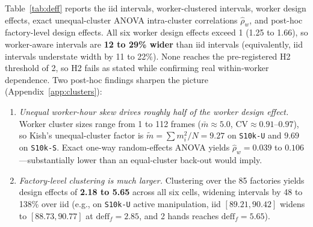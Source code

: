 \documentclass[11pt]{article}
\begin{document}
Table~\ref{tab:deff} reports the iid intervals, worker-clustered intervals, worker design effects,
exact unequal-cluster ANOVA intra-cluster correlations $\hat{\rho}_w$, and post-hoc factory-level
design effects. All six worker design effects exceed 1 (1.25 to 1.66), so worker-aware intervals
are \textbf{12 to 29\% wider} than iid intervals (equivalently, iid intervals understate width by
11 to 22\%). None reaches the pre-registered H2 threshold of 2, so H2 fails as stated while
confirming real within-worker dependence. Two post-hoc findings sharpen the picture
(Appendix~\ref{app:clusters}):
\begin{enumerate}
\item \emph{Unequal worker-hour skew drives roughly half of the worker design effect.} Worker
      cluster sizes range from 1 to 112 frames ($\bar{m} \approx 5.0$, $\text{CV} \approx
      0.91\text{--}0.97$), so Kish's unequal-cluster factor is $\tilde{m} = \sum m_i^2 / N = 9.27$
      on \texttt{S10k-U} and $9.69$ on \texttt{S10k-S}. Exact one-way random-effects ANOVA yields
      $\hat{\rho}_w = 0.039$ to $0.106$---substantially lower than an equal-cluster back-out would
      imply.
\item \emph{Factory-level clustering is much larger.} Clustering over the 85 factories yields
      design effects of \textbf{2.18 to 5.65} across all six cells, widening intervals by 48 to
      138\% over iid (e.g., on \texttt{S10k-U} active manipulation, iid $[89.21, 90.42]$ widens to
      $[88.73, 90.77]$ at $\text{deff}_f = 2.85$, and 2 hands reaches $\text{deff}_f = 5.65$).
\end{enumerate}
\end{document}
